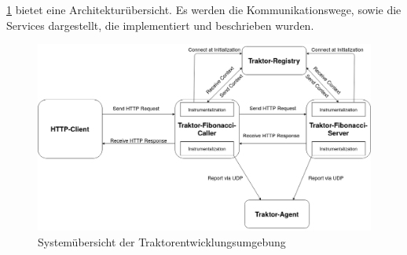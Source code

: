 \cref{fig:TraktorEnv-ApplicationArchitecture} bietet eine Architekturübersicht. Es werden die Kommunikationswege, sowie die Services dargestellt, die implementiert und beschrieben wurden.

\begin{figure}[]
	\centering
	\includegraphics[scale=0.3]{img/Implementierung/TraktorEnv-ApplicationArchitecture.png}
	\caption[Systemübersicht der Traktorentwicklungsumgebung]{Systemübersicht der Traktorentwicklungsumgebung}
	\label{fig:TraktorEnv-ApplicationArchitecture}
\end{figure}
